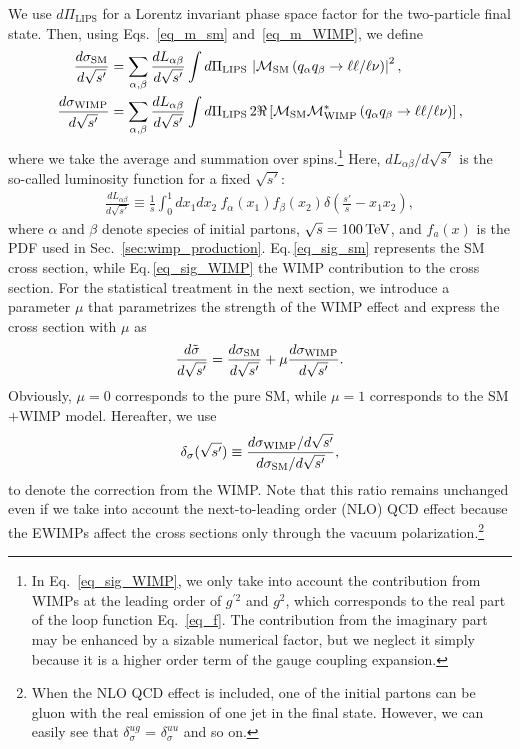 \documentclass[12pt,twoside,book]{article}
\begin{document}
We use $d\Pi_{\mathrm{LIPS}}$ for a Lorentz invariant phase space factor for the two-particle final state.
Then, using Eqs.~\eqref{eq_m_sm} and~\eqref{eq_m_WIMP}, we define
\begin{align}
 \frac{d \sigma_{\rm SM}}{d\sqrt{s'}} &= \sum_{\alpha, \beta}
 \frac{dL_{\alpha \beta}}{d\sqrt{s'}} \int d\Pi_{\mathrm{LIPS}}\, \left| \mathcal{M}_{\rm SM} \left( q_\alpha q_\beta \to \ell\ell / \ell\nu \right) \right|^2,\label{eq_sig_sm}\\
 \frac{d \sigma_{\rm WIMP}}{d\sqrt{s'}} &= \sum_{\alpha, \beta}
 \frac{dL_{\alpha \beta}}{d\sqrt{s'}} \int d\Pi_{\mathrm{LIPS}}\, 2 \Re \left[ \mathcal{M}_{\rm SM}
 \mathcal{M}_{\rm WIMP}^{*} \left( q_\alpha q_\beta \to \ell\ell / \ell\nu
 \right) \right],\label{eq_sig_WIMP}
\end{align}
where we take the average and summation over spins.\footnote{
  In Eq.~\eqref{eq_sig_WIMP}, we only take into account the contribution from WIMPs at the leading order of $g^{'2}$ and $g^2$, which corresponds to the real part of the loop function Eq.~\eqref{eq_f}.
  The contribution from the imaginary part may be enhanced by a sizable numerical factor, but we neglect it simply because it is a higher order term of the gauge coupling expansion.
}
Here, $dL_{\alpha \beta} / d\sqrt{s'}$ is the so-called luminosity function for a fixed
$\sqrt{s'}$:
\begin{align}
 \frac{d L_{\alpha \beta}}{d\sqrt{s'}} \equiv \frac{1}{s} \int_0^1 dx_1
 dx_2~f_\alpha(x_1) f_\beta(x_2) \delta\left(\frac{s'}{s} - x_1 x_2\right),
\end{align}
where $\alpha$ and $\beta$ denote species of initial partons, $\sqrt{s} = 100\,{\rm TeV}$, and $f_a(x)$ is the PDF used in Sec.~\ref{sec:wimp_production}.
Eq.\,\eqref{eq_sig_sm} represents the SM cross section, while Eq.\,\eqref{eq_sig_WIMP} the WIMP contribution to the cross section.
For the statistical treatment in the next section, we introduce a parameter $\mu$ that parametrizes the strength of the WIMP effect and express the cross section with $\mu$ as
\begin{align}
 \frac{d\tilde{\sigma}}{d\sqrt{s'}} =
 \frac{d\sigma_{\rm SM}}{d\sqrt{s'}}
 + \mu \frac{d\sigma_{\rm WIMP}}{d\sqrt{s'}}.
 \label{eq_diffcrosssection}
\end{align}
Obviously, $\mu=0$ corresponds to the pure SM, while $\mu=1$ corresponds to the SM$+$WIMP model.
Hereafter, we use
\begin{align}
 \delta_\sigma ( \sqrt{s'} ) \equiv \frac{d\sigma_{\rm
 WIMP} / d\sqrt{s'}}{d\sigma_{\rm SM} /
 d\sqrt{s'}},\label{eq_dsigma}
\end{align}
to denote the correction from the WIMP.
Note that this ratio remains unchanged even if we take into account the next-to-leading order (NLO) QCD effect because the EWIMPs affect the cross sections only through the vacuum polarization.\footnote
{
  When the NLO QCD effect is included, one of the initial partons can be gluon with the real emission of one jet in the final state.
  However, we can easily see that $\delta_\sigma^{ug}$ = $\delta_\sigma^{uu}$ and so on.
}
\end{document}
